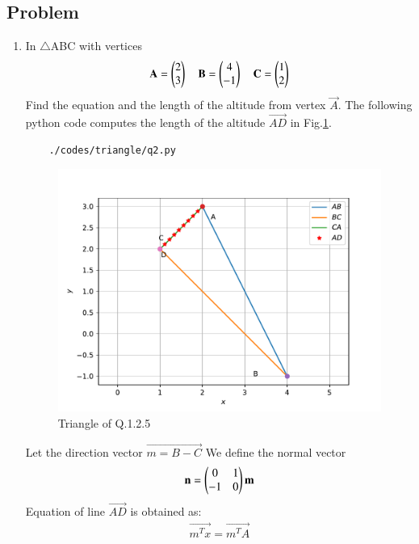 \subsection{Problem}
\renewcommand{\theequation}{\theenumi}
\begin{enumerate}[label=\thesection.\arabic*.,ref=\thesection.\theenumi]

\item In $\triangle$ABC with vertices 
\begin{multline}
\mathbf{A} = \begin{pmatrix}2\\3\end{pmatrix}\quad
\mathbf{B} = \begin{pmatrix}4\\-1\end{pmatrix}\quad
\mathbf{C} = \begin{pmatrix}1\\2\end{pmatrix}
\end{multline}
	Find the equation and the length of the altitude from vertex $\vec{A}$.
	The following python code computes the length of the altitude $\vec{AD}$ in Fig.\ref{fig:qtwo}.
	\begin{lstlisting}
	./codes/triangle/q2.py
	\end{lstlisting}
	
	\begin{figure}[!ht]
	\centering
	\includegraphics[width=\columnwidth]{./figs/triangle/q2.pdf}
	\caption{Triangle of Q.1.2.5}
	\label{fig:qtwo}	
	\end{figure}
	
	
	\solution Let the direction vector $\vec{m = B-C}$
	We define the normal vector
	\begin{align}
		\mathbf{n} = \begin{pmatrix}0&1\\-1&0\end{pmatrix}\mathbf{m}
	\end{align}
	Equation of line $\vec{AD}$ is obtained as:
	\begin{align}
		\vec{m^Tx} = \vec{m^TA}
	\end{align}
	

\end{enumerate}
